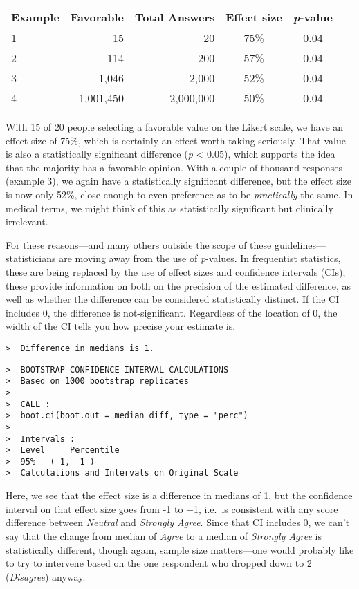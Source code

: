 \documentclass[]{book}
\begin{document}
\begin{longtable}[]{@{}lrrcc@{}}
\toprule
Example & Favorable & Total Answers & Effect size &
\emph{p}-value\tabularnewline
\midrule
\endhead
1 & 15 & 20 & 75\% & 0.04\tabularnewline
2 & 114 & 200 & 57\% & 0.04\tabularnewline
3 & 1,046 & 2,000 & 52\% & 0.04\tabularnewline
4 & 1,001,450 & 2,000,000 & 50\% & 0.04\tabularnewline
\bottomrule
\end{longtable}

With 15 of 20 people selecting a favorable value on the Likert scale, we
have an effect size of 75\%, which is certainly an effect worth taking
seriously. That value is also a statistically significant difference
(\emph{p} \textless{} 0.05), which supports the idea that the majority
has a favorable opinion. With a couple of thousand responses (example
3), we again have a statistically significant difference, but the effect
size is now only 52\%, close enough to even-preference as to be
\emph{practically} the same. In medical terms, we might think of this as
statistically significant but clinically irrelevant.

For these
reasons---\href{http://www.tandfonline.com/doi/full/10.1080/00031305.2016.1154108}{and
many others outside the scope of these guidelines}---statisticians are
moving away from the use of \emph{p}-values. In frequentist statistics,
these are being replaced by the use of effect sizes and confidence
intervals (CIs); these provide information on both on the precision of
the estimated difference, as well as whether the difference can be
considered statistically distinct. If the CI includes 0, the difference
is not-significant. Regardless of the location of 0, the width of the CI
tells you how precise your estimate is.

\begin{verbatim}
>  Difference in medians is 1.
\end{verbatim}

\begin{verbatim}
>  BOOTSTRAP CONFIDENCE INTERVAL CALCULATIONS
>  Based on 1000 bootstrap replicates
>  
>  CALL : 
>  boot.ci(boot.out = median_diff, type = "perc")
>  
>  Intervals : 
>  Level     Percentile     
>  95%   (-1,  1 )  
>  Calculations and Intervals on Original Scale
\end{verbatim}

Here, we see that the effect size is a difference in medians of 1, but
the confidence interval on that effect size goes from -1 to +1, i.e.~is
consistent with any score difference between \emph{Neutral} and
\emph{Strongly Agree}. Since that CI includes 0, we can't say that the
change from median of \emph{Agree} to a median of \emph{Strongly Agree}
is statistically different, though again, sample size matters---one
would probably like to try to intervene based on the one respondent who
dropped down to 2 (\emph{Disagree}) anyway.
\end{document}
